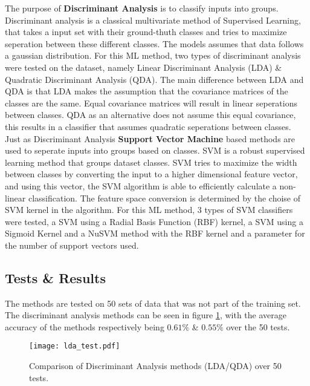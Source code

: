 \documentclass[../main.tex]{subfiles}
\begin{document}
The purpose of \textbf{Discriminant Analysis} is to classify inputs into groups.
Discriminant analysis is a classical multivariate method of Supervised Learning, that takes a input set with their ground-thuth classes and tries to maximize seperation between these different classes.
The models assumes that data follows a gaussian distribution. 
For this ML method, two types of discriminant analysis were tested on the dataset, namely
Linear Discriminant Analysis (LDA) \& Quadratic Discriminant Analysis (QDA).
The main difference between LDA and QDA is that LDA makes the assumption that the covariance matrices of the classes are the same.
Equal covariance matrices will result in linear seperations between classes.
QDA as an alternative does not assume this equal covariance, this results in a classifier that assumes quadratic seperations between classes.
Just as Discriminant Analysis \textbf{Support Vector Machine} based methods are used to seperate inputs into groups based on classes.
SVM is a robust supervised learning method that groups dataset classes.
SVM tries to maximize the width between classes by converting the input to a higher dimensional feature vector, and using this vector, the SVM algorithm is able to efficiently calculate a non-linear classification.
The feature space conversion is determined by the choise of SVM kernel in the algorithm.
For this ML method, 3 types of SVM classifiers were tested, a SVM using a Radial Basis Function (RBF) kernel, a SVM using a Sigmoid Kernel and a NuSVM method with the RBF kernel and a parameter for the number of support vectors used.

\subsection{Tests \& Results}

The methods are tested on 50 sets of data that was not part of the training set.
The discriminant analysis methods can be seen in figure \ref{fig:lda_test}, with the average accuracy of the methods respectively being $0.61\%$ \& $0.55\%$ over the 50 tests.

\begin{figure}[H]
\begin{center}
\texttt{[image: lda\_test.pdf]}
\caption{Comparison of Discriminant Analysis methods (LDA/QDA) over 50 tests.}
\label{fig:lda_test}
\end{center}
\end{figure}
\end{document}
